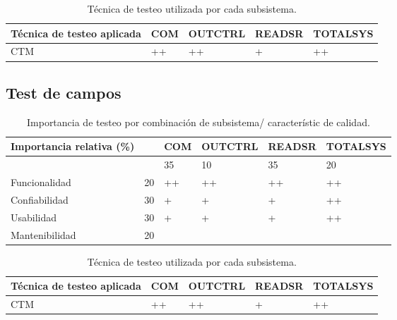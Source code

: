 \documentclass[12pt,a4paper, twosite]{article}
\begin{document}
\begin{table}[ht]
    \centering
    \begin{tabular}{|l|l|l|l|l|}\hline \hline
 Técnica de testeo aplicada & COM & OUTCTRL & READSR & TOTALSYS\\
        \hline
      CTM & ++ &++ &+ & ++ \\
        \hline
    \end{tabular}
    \caption{Técnica de testeo utilizada por cada subsistema.}
\end{table}

\subsection{Test de campos}
\begin{table}[ht]
    \centering
    \begin{tabular}{|l|l|l|l|l|l|}\hline \hline
 Importancia relativa (\%)& &  COM & OUTCTRL & READSR & TOTALSYS\\
        \hline
       
            &  &35 & 10 &35 & 20                          \\
        Funcionalidad    & 20 & ++ & ++ & ++ & ++		\\
        Confiabilidad    & 30 & + & + & + & ++                        \\
        Usabilidad       & 30 & + & + & + & ++                        \\
        Mantenibilidad   & 20 &  & &  &                         \\
        \hline
    \end{tabular}
    \caption{Importancia de testeo por combinación de subsistema/ característic de calidad.}
\end{table}


\begin{table}[ht]
    \centering
    \begin{tabular}{|l|l|l|l|l|}\hline \hline
 Técnica de testeo aplicada & COM & OUTCTRL & READSR & TOTALSYS\\
        \hline
      CTM & ++ &++ &+ & ++ \\
        \hline
    \end{tabular}
    \caption{Técnica de testeo utilizada por cada subsistema.}
\end{table}
\end{document}
